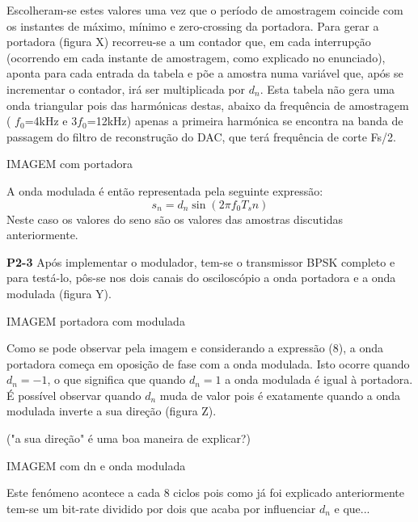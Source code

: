 \documentclass[11pt]{article}
\begin{document}
Escolheram-se estes valores uma vez que o período de amostragem coincide com os instantes de máximo, mínimo e zero-crossing da portadora. Para gerar a portadora (figura X) recorreu-se a um contador que, em cada interrupção (ocorrendo em cada instante de amostragem, como explicado no enunciado), aponta para cada entrada da tabela e põe a amostra numa variável que, após se incrementar o contador, irá ser multiplicada por $d_n$. Esta tabela não gera uma onda triangular pois das harmónicas destas, abaixo da frequência de amostragem ( $f_0$=4kHz e 3$f_0$=12kHz) apenas a primeira harmónica se encontra na banda de passagem do filtro de reconstrução do DAC, que terá frequência de corte Fs/2.

IMAGEM com portadora

A onda modulada é então representada pela seguinte expressão:
\begin{equation}
	s_n= d_n \sin(2 \pi f_0T_sn) 
\end{equation}
Neste caso os valores do seno são os valores das amostras discutidas anteriormente.


\vspace{2 mm}

\textbf{P2-3}
Após implementar o modulador, tem-se o transmissor BPSK completo e para testá-lo, pôs-se nos dois canais do osciloscópio a onda portadora e a onda modulada (figura Y).

IMAGEM portadora com modulada 
\vspace{2 mm}

Como se pode observar pela imagem e considerando a expressão (8), a onda portadora começa em oposição de fase com a onda modulada. Isto ocorre quando $d_n=-1$, o que significa que quando $d_n=1$ a onda modulada é igual à portadora. É possível observar quando $d_n$ muda de valor pois é exatamente quando a onda modulada inverte a sua direção (figura Z). 

("a sua direção" é uma boa maneira de explicar?) 

IMAGEM com dn e onda modulada

Este fenómeno acontece a cada 8 ciclos pois como já foi explicado anteriormente tem-se um bit-rate dividido por dois que acaba por influenciar $d_n$ e que... 
\vspace{2 mm}
\end{document}
